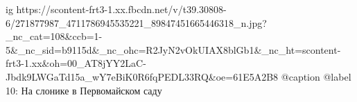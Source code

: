  
 
 
 
 

\ifcmt
  ig https://scontent-frt3-1.xx.fbcdn.net/v/t39.30808-6/271877987_4711786945535221_89847451665446318_n.jpg?_nc_cat=108&ccb=1-5&_nc_sid=b9115d&_nc_ohc=R2JyN2vOkUIAX8blGb1&_nc_ht=scontent-frt3-1.xx&oh=00_AT8jYY2LaC-Jbdk9LWGaTd15a_wY7eBiK0R6fqPEDL33RQ&oe=61E5A2B8
  @caption @label 10: На слонике в Первомайском саду
\fi
